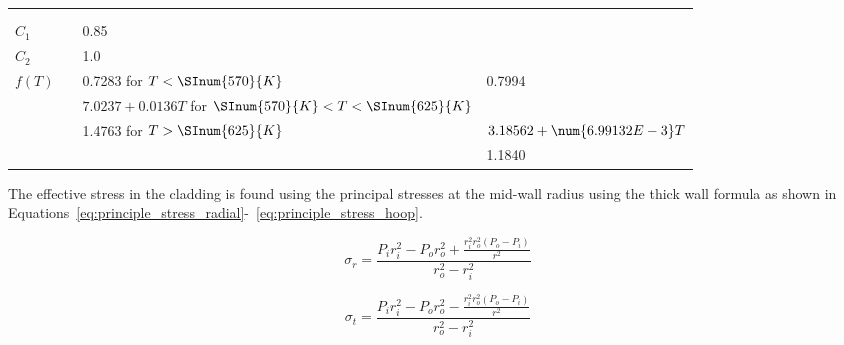 \begin{longtable}[c]{D{1.0in} D{0.5in} A{3.5in} A{1.0in}}
                                &           &                                                                          &                                           \\         
                                &                            &                                                                          &                                           \\    
        $C_{1}$                 &            &       0.85                                                               &                                           \\
        $C_{2}$                 &            &       1.0                                                                &                                           \\
        $f(T)$                  &            &       0.7283 for $T< \SInum{570}{K}$                                     &       0.7994                              \\ 
                                &                            &       $7.0237+0.0136T$ for $\SInum{570}{K}<T<\SInum{625}{K}$             &                                           \\
                                &                            &       1.4763 for $T>\SInum{625}{K}$                                      &      $3.18562+\num{6.99132E-3}T$          \\
                                &                            &                                                                          &       1.1840                              \\
\end{longtable}

The effective stress in the cladding is found using the principal stresses at the mid-wall radius
using the thick wall formula as shown in
Equations~\ref{eq:principle_stress_radial}-~\ref{eq:principle_stress_hoop}.

\begin{equation}
    \label{eq:principle_stress_radial}
    \sigma_{r} = \frac{P_{i}r_{i}^{2}-P_{o}r_{o}^{2} + \frac {r_{i}^2r_{o}^2 \left(P_{o} - P_{i}\right)}{r^{2}}}{r_{o}^{2}- r_{i}^{2}}    
\end{equation}

\begin{equation}
    \label{eq:principle_stress_tangential}
    \sigma_{t} = \frac{P_{i}r_{i}^{2}-P_{o}r_{o}^{2} - \frac {r_{i}^2r_{o}^2 \left(P_{o} - P_{i}\right)}{r^{2}}}{r_{o}^{2}- r_{i}^{2}}    
\end{equation}

